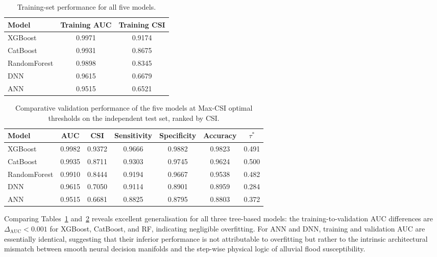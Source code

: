 \documentclass[12pt, a4paper]{article}
\begin{document}
\begin{table}[H]
\centering
\caption{Training-set performance for all five models.}
\label{tab:training}
\begin{adjustbox}{max width=\linewidth}
\begin{tabular}{lcc}
\toprule
\textbf{Model} & \textbf{Training AUC} & \textbf{Training CSI} \\
\midrule
XGBoost       & 0.9971 & 0.9174 \\
CatBoost      & 0.9931 & 0.8675 \\
RandomForest  & 0.9898 & 0.8345 \\
DNN           & 0.9615 & 0.6679 \\
ANN           & 0.9515 & 0.6521 \\
\bottomrule
\end{tabular}
\end{adjustbox}
\end{table}

\begin{table}[H]
\centering
\caption{Comparative validation performance of the five models at Max-CSI optimal thresholds on the independent test set, ranked by CSI.}
\label{tab:results}
\begin{adjustbox}{max width=\linewidth}
\begin{tabular}{lcccccc}
\toprule
\textbf{Model} & \textbf{AUC} & \textbf{CSI} & \textbf{Sensitivity} & \textbf{Specificity} & \textbf{Accuracy} & \textbf{$\tau^*$} \\
\midrule
XGBoost       & 0.9982 & 0.9372 & 0.9666 & 0.9882 & 0.9823 & 0.491 \\
CatBoost      & 0.9935 & 0.8711 & 0.9303 & 0.9745 & 0.9624 & 0.500 \\
RandomForest  & 0.9910 & 0.8444 & 0.9194 & 0.9667 & 0.9538 & 0.482 \\
DNN           & 0.9615 & 0.7050 & 0.9114 & 0.8901 & 0.8959 & 0.284 \\
ANN           & 0.9515 & 0.6681 & 0.8825 & 0.8795 & 0.8803 & 0.372 \\
\bottomrule
\end{tabular}
\end{adjustbox}
\end{table}

Comparing Tables~\ref{tab:training} and~\ref{tab:results} reveals excellent generalisation for all three tree-based models: the training-to-validation AUC differences are $\Delta_\text{AUC} < 0.001$ for XGBoost, CatBoost, and RF, indicating negligible overfitting. For ANN and DNN, training and validation AUC are essentially identical, suggesting that their inferior performance is not attributable to overfitting but rather to the intrinsic architectural mismatch between smooth neural decision manifolds and the step-wise physical logic of alluvial flood susceptibility.
\end{document}
